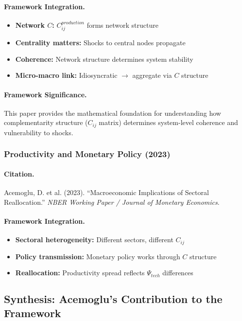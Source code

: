 \documentclass[12pt,a4paper]{article}
\begin{document}
\paragraph{Framework Integration.}
\begin{itemize}
  \item \textbf{Network $C$:} $C_{ij}^{production}$ forms network structure
  \item \textbf{Centrality matters:} Shocks to central nodes propagate
  \item \textbf{Coherence:} Network structure determines system stability
  \item \textbf{Micro-macro link:} Idiosyncratic $\to$ aggregate via $C$ structure
\end{itemize}

\paragraph{Framework Significance.}
This paper provides the mathematical foundation for understanding
how complementarity structure ($C_{ij}$ matrix) determines system-level
coherence and vulnerability to shocks.

\subsubsection{Productivity and Monetary Policy (2023)}

\paragraph{Citation.}
Acemoglu, D. et al. (2023).
``Macroeconomic Implications of Sectoral Reallocation.''
\emph{NBER Working Paper / Journal of Monetary Economics}.

\paragraph{Framework Integration.}
\begin{itemize}
  \item \textbf{Sectoral heterogeneity:} Different sectors, different $C_{ij}$
  \item \textbf{Policy transmission:} Monetary policy works through $C$ structure
  \item \textbf{Reallocation:} Productivity spread reflects $\Psi_{tech}$ differences
\end{itemize}

\subsection{Synthesis: Acemoglu's Contribution to the Framework}
\end{document}
